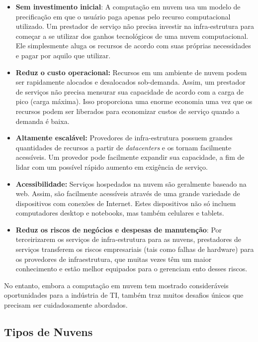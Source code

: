 \begin{itemize}
	\item \textbf{Sem investimento inicial}: A computação em nuvem usa um modelo de precificação em que o usuário paga apenas pelo recurso computacional utilizado. Um prestador de serviço não precisa	investir na infra-estrutura para começar a se utilizar dos ganhos tecnológicos de uma nuvem computacional. Ele simplesmente aluga os recursos de acordo com suas próprias necessidades e pagar por aquilo que utilizar.
	\item \textbf{Reduz o custo operacional:} Recursos em um ambiente de nuvem podem ser rapidamente alocados e desalocados sob-demanda. Assim, um prestador de serviços não precisa  mensurar sua capacidade de acordo com a carga de pico (carga máxima). Isso proporciona uma enorme economia uma vez que os recursos podem ser liberados para economizar custos de serviço quando a demanda é baixa.	
	\item \textbf{Altamente escalável:} Provedores de infra-estrutura possuem grandes quantidades de recursos a partir de \textit{datacenters} e os tornam facilmente acessíveis. Um provedor pode facilmente expandir sua capacidade, a fim de lidar com um possível rápido aumento em exigência de serviço.	
	\item \textbf{Acessibilidade:} Serviços hospedados na nuvem são geralmente	baseado na web. Assim, são facilmente acessíveis através de uma grande variedade de dispositivos com conexões de Internet. Estes dispositivos não só incluem computadores desktop e notebooks, mas também celulares e tablets.
	\item \textbf{Reduz os riscos de negócios e despesas de manutenção}: Por terceirizarem os serviços de infra-estrutura para as nuvens, prestadores de serviços transferem os riscos empresariais (tais como falhas de hardware) para os provedores de infraestrutura, que muitas vezes têm um maior conhecimento e estão melhor equipados para o gerenciam	ento desses riscos.
\end{itemize}

No entanto, embora a computação em nuvem tem mostrado consideráveis oportunidades para a indústria de TI, também traz muitos desafios únicos que precisam ser cuidadosamente abordados. 

\subsection{Tipos de Nuvens} \label{cap2sec2subsec2}

